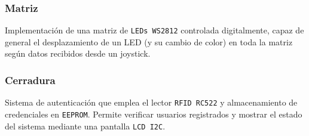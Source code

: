 \vspace{1em}

\subsubsection{Matriz}
Implementación de una matriz de \texttt{LEDs WS2812} controlada digitalmente, capaz de general el desplazamiento de un LED (y su cambio de color) en toda la matriz según datos recibidos desde un joystick.

\vspace{1em}

\subsubsection{Cerradura}
Sistema de autenticación que emplea el lector \texttt{RFID RC522} y almacenamiento de credenciales en \texttt{EEPROM}. Permite verificar usuarios registrados y mostrar el estado del sistema mediante una pantalla \texttt{LCD I2C}.


